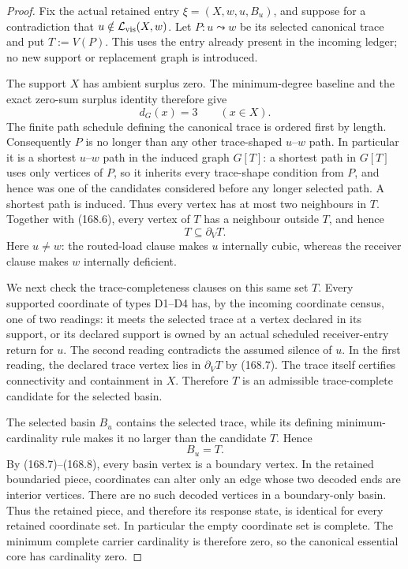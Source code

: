 \documentclass[11pt]{article}
\begin{document}
\begin{proof}
Fix the actual retained entry \(\xi=(X,w,u,B_u)\), and suppose for a
contradiction that \(u\notin\mathcal L_{\rm vis}(X,w)\).  Let
\(P:u\leadsto w\) be its selected canonical trace and put
\(T:=V(P)\).  This uses the entry already present in the incoming ledger; no
new support or replacement graph is introduced.

The support \(X\) has ambient surplus zero.  The minimum-degree baseline and
the exact zero-sum surplus identity therefore give
\[
                         d_G(x)=3\qquad(x\in X).          \tag{168.6}
\]
The finite path schedule defining the canonical trace is ordered first by
length.  Consequently \(P\) is no longer than any other trace-shaped
\(u\)--\(w\) path.  In particular it is a shortest \(u\)--\(w\) path in the
induced graph \(G[T]\): a shortest path in \(G[T]\) uses only vertices of
\(P\), so it inherits every trace-shape condition from \(P\), and hence was
one of the candidates considered before any longer selected path.  A shortest
path is induced.  Thus every vertex has at most two neighbours in \(T\).
Together with \textup{(168.6)}, every vertex of \(T\) has a neighbour outside
\(T\), and hence
\[
                       T\subseteq\partial_V T.            \tag{168.7}
\]
Here \(u\ne w\): the routed-load clause makes \(u\) internally cubic, whereas
the receiver clause makes \(w\) internally deficient.

We next check the trace-completeness clauses on this same set \(T\).  Every
supported coordinate of types D1--D4 has, by the incoming coordinate census,
one of two readings: it meets the selected trace at a vertex declared in its
support, or its declared support is owned by an actual scheduled
receiver-entry return for \(u\).  The second reading contradicts the assumed
silence of \(u\).  In the first reading, the declared trace vertex lies in
\(\partial_VT\) by \textup{(168.7)}.  The trace itself certifies connectivity
and containment in \(X\).  Therefore \(T\) is an admissible trace-complete
candidate for the selected basin.

The selected basin \(B_u\) contains the selected trace, while its defining
minimum-cardinality rule makes it no larger than the candidate \(T\).  Hence
\[
                              B_u=T.                       \tag{168.8}
\]
By \textup{(168.7)}--\textup{(168.8)}, every basin vertex is a boundary
vertex.  In the retained boundaried piece, coordinates can alter only an edge
whose two decoded ends are interior vertices.  There are no such decoded
vertices in a boundary-only basin.  Thus the retained piece, and therefore
its response state, is identical for every retained coordinate set.  In
particular the empty coordinate set is complete.  The minimum complete
carrier cardinality is therefore zero, so the canonical essential core has
cardinality zero.


\end{proof}
\end{document}
